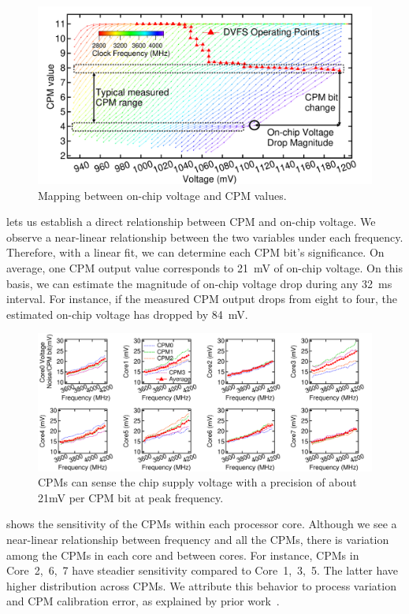 \begin{figure}
\centering
      \includegraphics[trim=25 0 25 0,clip,width=0.75\linewidth]{graphs/voltage/cpm2volt.pdf}
      \caption{Mapping between on-chip voltage and CPM values.}
      \label{fig:cpm2volt} 
\end{figure}

 lets us establish a direct relationship between CPM and on-chip voltage. We observe a near-linear relationship between the two variables under each frequency. Therefore, with a linear fit, we can determine each CPM bit's significance. On average, one CPM output value corresponds to 21~mV of on-chip voltage. On this basis, we can estimate the magnitude of on-chip voltage drop during any 32~ms interval. For instance, if the measured CPM output drops from eight to four, the estimated on-chip voltage has dropped by 84~mV. 

\begin{figure}
\centering
      \includegraphics[trim=5 0 10 0,clip,width=\linewidth]{graphs/voltage/cpm_process_variation.pdf}
      \caption{CPMs can sense the chip supply voltage with a precision of about 21mV per CPM bit at peak frequency.}
      \label{fig:cpmsensitivity} 
\end{figure}

 shows the sensitivity of the CPMs within each processor core. Although we see a near-linear relationship between frequency and all the CPMs, there is variation among the CPMs in each core and between cores. For instance, CPMs in Core~2,~6,~7 have steadier sensitivity compared to Core~1,~3,~5. The latter have higher distribution across CPMs. We attribute this behavior to process variation and CPM calibration error, as explained by prior work~\cite{floyd2013runtime}.


